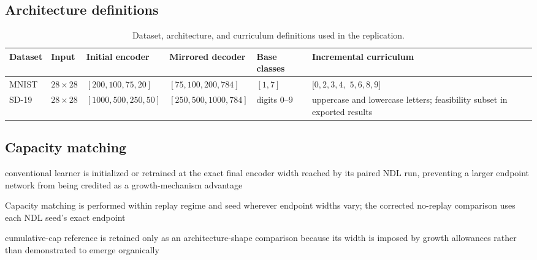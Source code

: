 \subsection{Architecture definitions}
\begin{table}[htbp]
\centering
\caption{Dataset, architecture, and curriculum definitions used in the replication.}
\label{tab:architecture-definitions}
\small
\begin{tabularx}{\textwidth}{p{1.5cm}p{1.4cm}p{3.0cm}p{3.0cm}p{2.4cm}Y}
\toprule
Dataset & Input & Initial encoder & Mirrored decoder & Base classes & Incremental curriculum \\
\midrule
MNIST & $28\times28$ & $[200,100,75,20]$ & $[75,100,200,784]$ & $[1,7]$ & $[0,2,3,4,$ $5,6,8,9]$ \\
SD-19 & $28\times28$ & $[1000,500,250,50]$ & $[250,500,1000,784]$ & digits $0$--$9$ & uppercase and lowercase letters; feasibility subset in exported results \\
\bottomrule
\end{tabularx}
\end{table}

\subsection{Capacity matching}
\begin{draftpoints}
  \item conventional learner is initialized or retrained at the exact final encoder width reached by its paired NDL run, preventing a larger endpoint network from being credited as a growth-mechanism advantage
  \item Capacity matching is performed within replay regime and seed wherever endpoint widths vary; the corrected no-replay comparison uses each NDL seed's exact endpoint
  \item cumulative-cap reference is retained only as an architecture-shape comparison because its width is imposed by growth allowances rather than demonstrated to emerge organically
\end{draftpoints}
